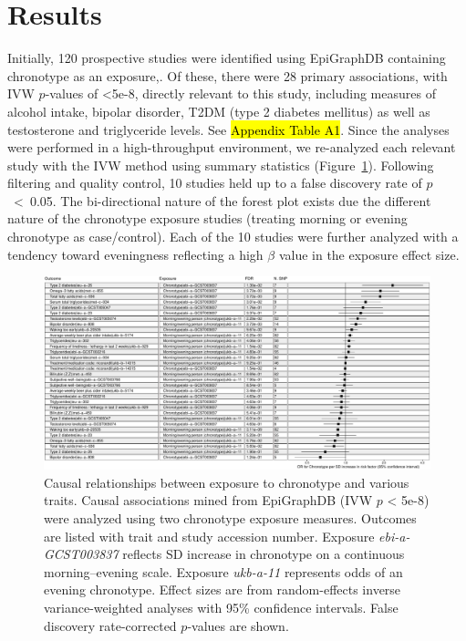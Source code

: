 \documentclass[genes,article,accept,moreauthors,pdftex]{Definitions/mdpi}
\begin{document}
\section{Results}
Initially, 120 prospective studies were identified using EpiGraphDB containing chronotype as an exposure,. Of these, there were 28 primary associations, with IVW $p$-values of <5e-8, directly relevant to this study, including measures of alcohol intake, bipolar disorder, T2DM (type 2 diabetes mellitus) as well as testosterone and triglyceride levels. See \hl{Appendix Table A1}. %
Since the analyses were performed in a high-throughput environment, we re-analyzed each relevant study with the IVW method using summary statistics (\mbox{Figure~\ref{forestIVW}}). Following filtering and quality control, 10 studies held up to a false discovery rate of \mbox{$p$ < 0.05}. The bi-directional nature of the forest plot exists due the different nature of the chronotype exposure studies (treating morning or evening chronotype as case/control). Each of the 10 studies were further analyzed with a tendency toward eveningness reflecting a high $\beta$ value in the exposure effect size. 
\begin{figure}[H]
	\includegraphics[width=0.95\linewidth]{Figs/Analysis1/new_forestIVW1a.pdf}
	\caption{Causal relationships between exposure to chronotype and various traits. Causal associations mined from EpiGraphDB (IVW $p$ < 5e-8) were analyzed using two chronotype exposure measures. Outcomes are listed with trait and study accession number. Exposure \textit{ebi-a-GCST003837} reflects SD increase in chronotype on a continuous morning--evening scale. Exposure \textit{ukb-a-11} represents odds of an evening chronotype. Effect sizes are from {random}-effects inverse variance-weighted analyses with 95\% confidence intervals. False discovery rate-corrected $p$-values are shown.}
	\label{forestIVW}
\end{figure}
\end{document}
